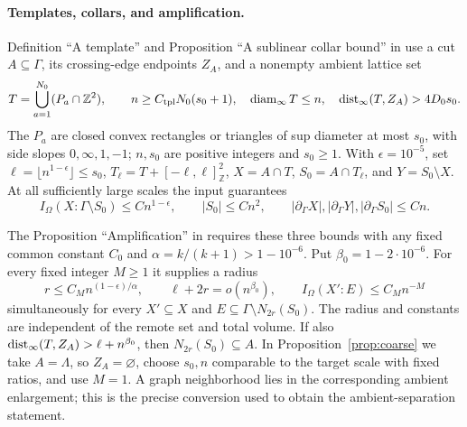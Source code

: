 \paragraph{Templates, collars, and amplification.}
Definition ``A template'' and Proposition ``A sublinear collar bound'' in
\cite[Section~9]{RepoAreaLaw} use a cut $A\subseteq\Gamma$, its crossing-edge
endpoints $Z_A$, and a nonempty ambient lattice set
\[
 T=\bigcup_{a=1}^{N_0}(P_a\cap\mathbb Z^2),\qquad
 n\ge C_{\rm tpl}N_0(s_0+1),\quad \operatorname{diam}_\infty T\le n,
 \quad \operatorname{dist}_\infty(T,Z_A)>4D_0s_0.
\]
The $P_a$ are closed convex rectangles or triangles of sup diameter at most
$s_0$, with side slopes $0,\infty,1,-1$; $n,s_0$ are positive integers and
$s_0\ge1$. With $\epsilon=10^{-5}$, set
$\ell=\lfloor n^{1-\epsilon}\rfloor\le s_0$,
$T_\ell=T+[-\ell,\ell]^2_{\mathbb Z}$, $X=A\cap T$,
$S_0=A\cap T_\ell$, and $Y=S_0\setminus X$.
At all sufficiently large scales the input guarantees
\[
 I_\Omega(X:\Gamma\setminus S_0)\le Cn^{1-\epsilon},\qquad
 |S_0|\le Cn^2,\qquad
 |\partial_\Gamma X|,|\partial_\Gamma Y|,|\partial_\Gamma S_0|\le Cn.
\]

The Proposition ``Amplification'' in \cite[Section~10]{RepoAreaLaw}
requires these three bounds with any fixed common constant $C_0$ and
$\alpha=k/(k+1)>1-10^{-6}$. Put $\beta_0=1-2\cdot10^{-6}$.
For every fixed integer $M\ge1$ it supplies a radius
\[
 r\le C_M n^{(1-\epsilon)/\alpha},\qquad
 \ell+2r=o(n^{\beta_0}),\qquad
 I_\Omega(X':E)\le C_M n^{-M}
\]
simultaneously for every $X'\subseteq X$ and
$E\subseteq\Gamma\setminus N_{2r}(S_0)$. The radius and constants are
independent of the remote set and total volume. If also
$\operatorname{dist}_\infty(T,Z_A)>\ell+n^{\beta_0}$, then
$N_{2r}(S_0)\subseteq A$. In Proposition~\ref{prop:coarse} we take
$A=\Lambda$, so $Z_A=\varnothing$, choose $s_0,n$ comparable to the target
scale with fixed ratios, and use $M=1$. A graph neighborhood lies in the
corresponding ambient enlargement; this is the precise conversion used to
obtain the ambient-separation statement.

